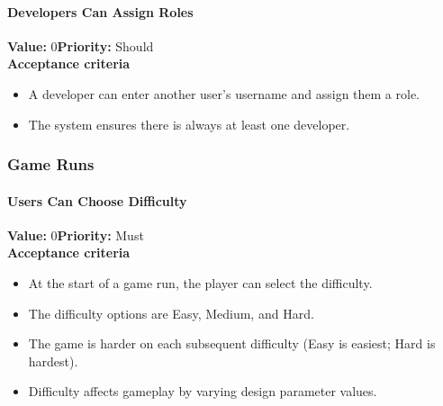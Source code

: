 \paragraph{Developers Can Assign Roles}
\textbf{Value:} 0\quad \textbf{Priority:} Should\\
\textbf{Acceptance criteria}
\begin{itemize}
  \item A developer can enter another user's username and assign them a role.
  \item The system ensures there is always at least one developer.
\end{itemize}

\subsubsection{Game Runs}

\paragraph{Users Can Choose Difficulty}
\textbf{Value:} 0\quad \textbf{Priority:} Must\\
\textbf{Acceptance criteria}
\begin{itemize}
  \item At the start of a game run, the player can select the difficulty.
  \item The difficulty options are Easy, Medium, and Hard.
  \item The game is harder on each subsequent difficulty (Easy is easiest; Hard is hardest).
  \item Difficulty affects gameplay by varying design parameter values.
\end{itemize}

